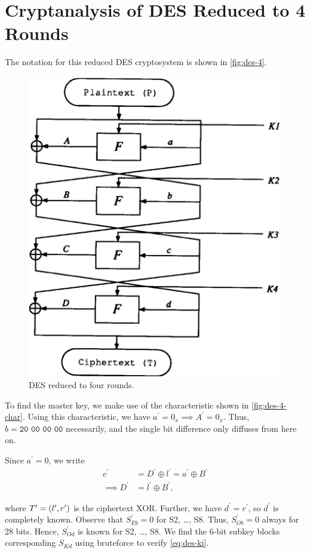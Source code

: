\documentclass[twoside]{article}
\begin{document}



\section{Cryptanalysis of DES Reduced to 4 Rounds}
The notation for this reduced DES cryptosystem is shown in \autoref{fig:des-4}.

\begin{figure}[!ht]
    \centering
    \includegraphics[width=0.5\linewidth]{images/des_4round.png}
    \caption{DES reduced to four rounds.}
    \label{fig:des-4}
\end{figure}

To find the master key, we make use of the characteristic shown in
\autoref{fig:des-4-char}. Using this characteristic, we have \(a^\prime = 0_x
\implies A^\prime = 0_x\). Thus, \(b = \texttt{20 00 00 00}\) necessarily, and
the single bit difference only diffuses from here on.

Since \(a^\prime = 0\), we write
\begin{align}
    c^\prime &= D^\prime \oplus l^\prime = a^\prime \oplus B^\prime \\
    \implies D^\prime &= l^\prime \oplus B^\prime,
    \label{eq:des-4rd-D}
\end{align}

where \(T^\prime = (l^\prime, r^\prime)\) is the ciphertext XOR. Further,
we have \(d^\prime = r^\prime\), so \(d^\prime\) is completely known. Observe
that \(S^\prime_{Eb} = 0\) for S2, \dots, S8. Thus, \(S^\prime_{Ob} = 0\) always
for 28 bits. Hence, \(S^\prime_{Od}\) is known for S2, \dots, S8. We find the
6-bit subkey blocks corresponding \(S_{Kd}\) using bruteforce to verify
\eqref{eq:des-ki}. 
\end{document}
